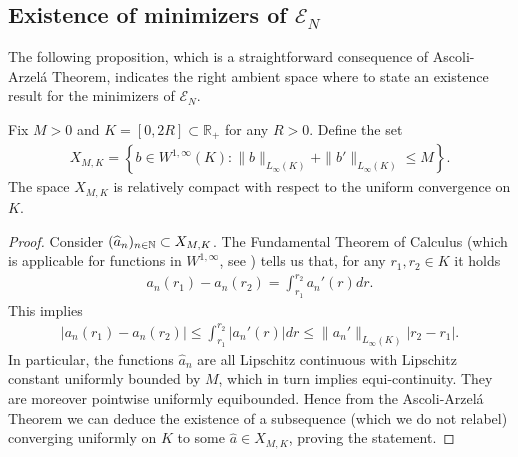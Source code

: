 \subsection{Existence of minimizers of $\mathcal E_N$}
The following proposition, which is a straightforward consequence of Ascoli-Arzel\'a Theorem, indicates the right ambient space where to state an existence result for the minimizers of $\mathcal E_N$.

\begin{proposition}\label{XMdef}
Fix $M > 0$ and $K=[0,2R] \subset  \mathbb R_+$ for any $R>0$. Define the set
\begin{align*}
X_{M,K} = \left\{b \in W^{1,\infty}(K) :
 \|b\|_{L_{\infty}(K)} + \|b'\|_{L_{\infty}(K)} \leq M
 \right\}.
\end{align*}
The space $X_{M,K}$ is relatively compact with respect to the uniform convergence on $K$.
\end{proposition}
\begin{proof}
Consider $(\widehat a_n)_{n \in \mathbb{N}} \subset X_{M,K}$. The Fundamental Theorem of Calculus (which is applicable for functions in $W^{1,\infty}$, see \cite[Theorem 2.8]{AFP00}) tells us that, for any $r_1,r_2 \in K$ it holds
	\begin{align*}
		a_n(r_1)-a_n(r_2)=\int_{r_1}^{r_2}a_n'(r)dr.
	\end{align*}
	This implies
	\begin{align*}
		\bigl|a_n(r_1)-a_n(r_2)\bigr|\leq\int_{r_1}^{r_2}|a_n'(r)|dr
			\leq \|a_n'\|_{L_\infty(K)}|r_2-r_1|.
	\end{align*}
	In particular, the functions $\widehat a_n$ are all Lipschitz continuous with Lipschitz constant uniformly bounded by
	$M$, which in turn implies equi-continuity. They are moreover pointwise uniformly equibounded.
Hence from the Ascoli-Arzel\'a Theorem we can deduce the existence of a subsequence (which we do not relabel) converging uniformly on $K$ to some $\widehat a \in X_{M,K}$, proving the statement.
\end{proof}

